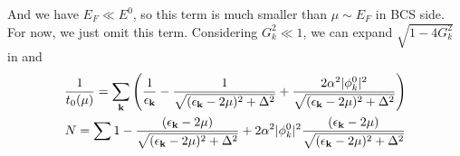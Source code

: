 And we have $E_{F}\ll{E^{0}}$, so this term is much smaller than $\mu\sim{E_{F}}$ in BCS side. For now, we just omit this term.  Considering $G_{k}^{2}\ll1$, we can expand $\sqrt{1-4G_{k}^{2}}$ in  and  
\begin{gather}
\frac{1}{{t_{0}}(\mu)}=\sum_{\mathbf{k}}
\left(\frac{1}{\epsilon_{\mathbf{k}}}-\frac{1}{\sqrt{{(\epsilon_{\mathbf{k}}-2\mu)^{2}+\Delta^{2}}}}
+\frac{2\alpha^{2}|\phi^{0}_{k}|^{2}}{\sqrt{{(\epsilon_{\mathbf{k}}-2\mu)^{2}+\Delta^{2}}}}\right)\label{eq:20101011:gapa}
\\
N=\sum{1-\frac{(\epsilon_{\ensuremath{\mathbf{k}}}-2\mu)}{{\sqrt{{(\epsilon_{\ensuremath{\mathbf{k}}}-2\mu)^{2}+\Delta^{2}}}}}
+2\alpha^{2}|\phi^{0}_{k}|^{2}\frac{(\epsilon_{\ensuremath{\mathbf{k}}}-2\mu)}{{\sqrt{{(\epsilon_{\ensuremath{\mathbf{k}}}-2\mu)^{2}+\Delta^{2}}}}}}
\label{eq:20101011:gapb}
\end{gather}
%
%
%
